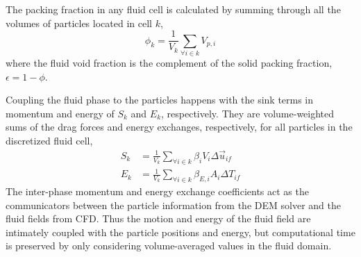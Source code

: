 The packing fraction in any fluid cell is calculated by summing through all the volumes of particles located in cell $k$,
\begin{equation}
	\phi_k = \frac{1}{V_k}\sum_{\forall i \in k} V_{p,i}
\end{equation}
where the fluid void fraction is the complement of the solid packing fraction, $\epsilon = 1 - \phi$. 

Coupling the fluid phase to the particles happens with the sink terms in momentum and energy of $S_k$ and $E_k$, respectively. They are volume-weighted sums of the drag forces and energy exchanges, respectively, for all particles in the discretized fluid cell,
\begin{subequations}\label{eq:cfd-sources}
\begin{align}
	S_k &= \frac{1}{V_k}\sum_{\forall i \in k} \beta_i V_i \Delta \vec{u}_{if} \label{eq:cfd-mom-source}\\
	E_k &= \frac{1}{V_k}\sum_{\forall i \in k} \beta_{E,i} A_i \Delta T_{if}
\end{align}
\end{subequations}
The inter-phase momentum and energy exchange coefficients act as the communicators between the particle information from the DEM solver and the fluid fields from CFD. Thus the motion and energy of the fluid field are intimately coupled with the particle positions and energy, but computational time is preserved by only considering volume-averaged values in the fluid domain. %





